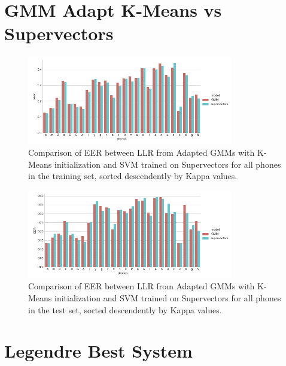 \section{GMM Adapt K-Means vs Supervectors}

\begin{figure}[H]
	\centering
	\includegraphics[width=0.8\textwidth]{files/figures/results/gmm-vs-supervectors/gmm-vs-supervectors-dev.png}
	\caption{Comparison of EER between LLR from Adapted GMMs with K-Means initialization
	and SVM trained on Supervectors for all phones in the training set, sorted
	descendently by Kappa values.}
	\label{fig:gmmSupervectorsDev}
\end{figure}

\begin{figure}[H]
	\centering
	\includegraphics[width=0.8\textwidth]{files/figures/results/gmm-vs-supervectors/gmm-vs-supervectors-heldout.png}
	\caption{Comparison of EER between LLR from Adapted GMMs with K-Means initialization
	and SVM trained on Supervectors for all phones in the test set, sorted descendently
	by Kappa values.}
	\label{fig:gmmSupervectorsTest}
\end{figure}


\section{Legendre Best System}

